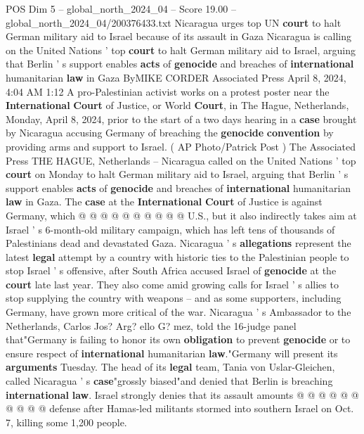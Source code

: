 \begin{textsample}{POS Dim 5 – global\_north\_2024\_04 – Score 19.00 – global\_north\_2024\_04/200376433.txt}  \label{ex:f5_pos_262}
Nicaragua urges top UN \textbf{court} to halt German military aid to Israel because of its assault in Gaza Nicaragua is calling on the United Nations ' top \textbf{court} to halt German military aid to Israel, arguing that Berlin ' s support enables \textbf{acts} of \textbf{genocide} and breaches of \textbf{international} humanitarian \textbf{law} in Gaza ByMIKE CORDER Associated Press April 8, 2024, 4:04 AM 1:12 A pro-Palestinian activist works on a protest poster near the \textbf{International} \textbf{Court} of Justice, or World \textbf{Court}, in The Hague, Netherlands, Monday, April 8, 2024, prior to the start of a two days hearing in a \textbf{case} brought by Nicaragua accusing Germany of breaching the \textbf{genocide} \textbf{convention} by providing arms and support to Israel. ( AP Photo/Patrick Post ) The Associated Press THE HAGUE, Netherlands -- Nicaragua called on the United Nations ' top \textbf{court} on Monday to halt German military aid to Israel, arguing that Berlin ' s support enables \textbf{acts} of \textbf{genocide} and breaches of \textbf{international} humanitarian \textbf{law} in Gaza.
The \textbf{case} at the \textbf{International} \textbf{Court} of Justice is against Germany, which @ @ @ @ @ @ @ @ @ @ U.S., but it also indirectly takes aim at Israel ' s 6-month-old military campaign, which has left tens of thousands of Palestinians dead and devastated Gaza.
Nicaragua ' s \textbf{allegations} represent the latest \textbf{legal} attempt by a country with historic ties to the Palestinian people to stop Israel ' s offensive, after South Africa accused Israel of \textbf{genocide} at the \textbf{court} late last year.
They also come amid growing calls for Israel ' s allies to stop supplying the country with weapons -- and as some supporters, including Germany, have grown more critical of the war.
Nicaragua ' s Ambassador to the Netherlands, Carlos Jos?
Arg? ello G? mez, told the 16-judge panel that"Germany is failing to honor its own \textbf{obligation} to prevent \textbf{genocide} or to ensure respect of \textbf{international} humanitarian \textbf{law}."Germany will present its \textbf{arguments} Tuesday.
The head of its \textbf{legal} team, Tania von Uslar-Gleichen, called Nicaragua ' s \textbf{case}"grossly biased"and denied that Berlin is breaching \textbf{international} \textbf{law}.
Israel strongly denies that its assault amounts @ @ @ @ @ @ @ @ @ @ defense after Hamas-led militants stormed into southern Israel on Oct. 7, killing some 1,200 people.

\end{textsample}
